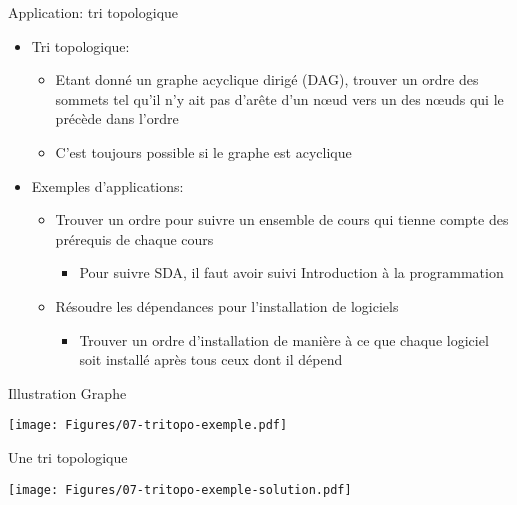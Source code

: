 \begin{frame}{Application: tri topologique}
\begin{itemize}
\item Tri topologique:
\begin{itemize}
\item Etant donné un \alert{graphe acyclique dirigé} (DAG), trouver un
  ordre des sommets tel qu'il n'y ait pas d'arête d'un n\oe ud vers un
  des n\oe uds qui le précède dans l'ordre
\item C'est toujours possible si le graphe est acyclique
\end{itemize}

\bigskip

\item Exemples d'applications:
\begin{itemize}
\item Trouver un ordre pour suivre un ensemble de cours qui tienne compte des prérequis de chaque cours
\begin{itemize}
\item Pour suivre SDA, il faut avoir suivi Introduction à la programmation
\end{itemize}
\item Résoudre les dépendances pour l'installation de logiciels
\begin{itemize}
\item Trouver un ordre d'installation de manière à ce que chaque logiciel soit installé après tous ceux dont il dépend
\end{itemize}
\end{itemize}
\end{itemize}

\end{frame}

\begin{frame}{Illustration}
Graphe

\centerline{\texttt{[image: Figures/07-tritopo-exemple.pdf]}}

\bigskip

Une tri topologique

\centerline{\texttt{[image: Figures/07-tritopo-exemple-solution.pdf]}}

\end{frame}

